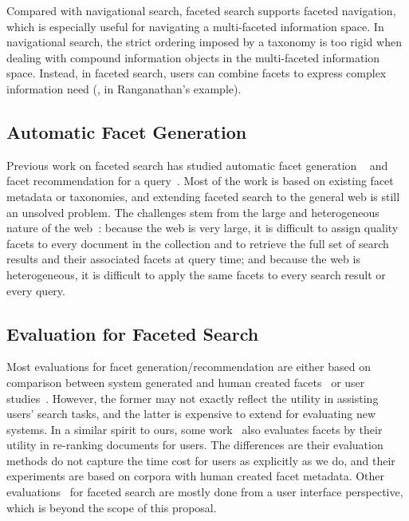 Compared with navigational search, faceted search supports faceted navigation, which is especially useful for navigating a multi-faceted information space. In navigational search, the strict ordering imposed by a taxonomy is too rigid when dealing with compound information objects in the multi-faceted information space. Instead, in faceted search, users can combine facets to express complex information need (\eg,  in  Ranganathan's example).

\subsection{Automatic Facet Generation}
Previous work on faceted search has studied automatic facet generation ~\cite{dakka2008automatic,li2010facetedpedia,stoica2007automating,oren2006extending,kohlschutter2006using,latha2010afgf} and facet recommendation for a query~\cite{dash2008dynamic,koren2008personalized}. Most of the work is based on existing facet metadata or taxonomies, and extending faceted search to the general web is still an unsolved problem. The challenges stem from the large and heterogeneous nature of the web~\cite{teevan2008challenges}: because the web is very large, it is
difficult to assign quality facets to every document in the collection and to retrieve the full set of search results and their associated facets at query time; and because the web is heterogeneous, it is difficult to apply the same facets to every search result or every query.

\subsection{Evaluation for Faceted Search}
Most evaluations for facet generation/recommendation are either based on comparison between system generated and human created facets~\cite{dakka2008automatic,dou2011finding} or user studies~\cite{dash2008dynamic,li2010facetedpedia,stoica2007automating}. However, the former may not exactly reflect the utility in assisting users' search tasks, and the latter is expensive to extend for evaluating new systems. In a similar spirit to ours, some work~\cite{schuth2011evaluation,zhang2010interactive,koren2008personalized} also evaluates facets by their utility in re-ranking documents for users. The differences are their evaluation methods do not capture the time cost for users as explicitly as we do, and their experiments are based on corpora with human created facet metadata. Other evaluations~\cite{burke1996knowledge,english2002hierarchical,hearst2006design,hearst2008uis,kules2009exploratory} for faceted search are mostly done from a user interface perspective, which is beyond the scope of 
this proposal.

